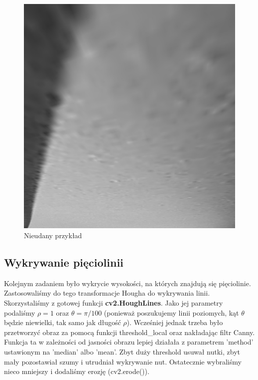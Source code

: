 \documentclass[11pt]{article}
\begin{document}
\begin{figure}[h!]
\centering
\graphicspath{ {output/} }
\includegraphics[scale=0.3]{warped15_gray.jpg}
\caption{Nieudany przykład}
\label{fig:universe}
\end{figure}

\pagebreak
\subsection{Wykrywanie pięciolinii}

Kolejnym zadaniem było wykrycie wysokości, na których znajdują się pięciolinie.
Zastosowaliśmy do tego transformacje Hougha do wykrywania linii. Skorzystaliśmy z gotowej funkcji \textbf{cv2.HoughLines}.
Jako jej parametry podaliśmy $\rho = 1 $ oraz $\theta = \pi / 100$ (ponieważ poszukujemy linii poziomych, kąt $\theta$ będzie niewielki, tak samo jak długość $\rho$).
Wcześniej jednak trzeba było przetworzyć obraz za pomocą funkcji threshold\_local oraz nakładając filtr Canny. 
Funkcja ta w zależności od jasności obrazu lepiej działała z parametrem 'method' ustawionym na 'median' albo 'mean'.
Zbyt duży threshold usuwał nutki, zbyt mały pozostawiał szumy i utrudniał wykrywanie nut.
Ostatecznie wybraliśmy nieco mniejszy i dodaliśmy erozję (cv2.erode()).
\newline
\end{document}
